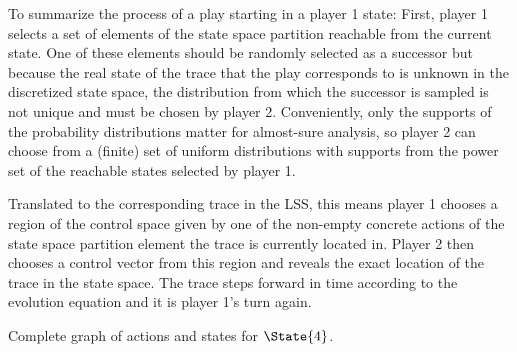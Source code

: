     To summarize the process of a play starting in a player 1 state:
    First, player 1 selects a set of elements of the state space partition reachable from the current state.
    One of these elements should be randomly selected as a successor but because the real state of the trace that the play corresponds to is unknown in the discretized state space, the distribution from which the successor is sampled is not unique and must be chosen by player 2.
    Conveniently, only the supports of the probability distributions matter for almost-sure analysis, so player 2 can choose from a (finite) set of uniform distributions with supports from the power set of the reachable states selected by player 1.

    Translated to the corresponding trace in the LSS, this means player 1 chooses a region of the control space given by one of the non-empty concrete actions of the state space partition element the trace is currently located in.
    Player 2 then chooses a control vector from this region and reveals the exact location of the trace in the state space.
    The trace steps forward in time according to the evolution equation and it is player 1's turn again.

    Complete graph of actions and states for $\State{4}$.


\stopsubsection

